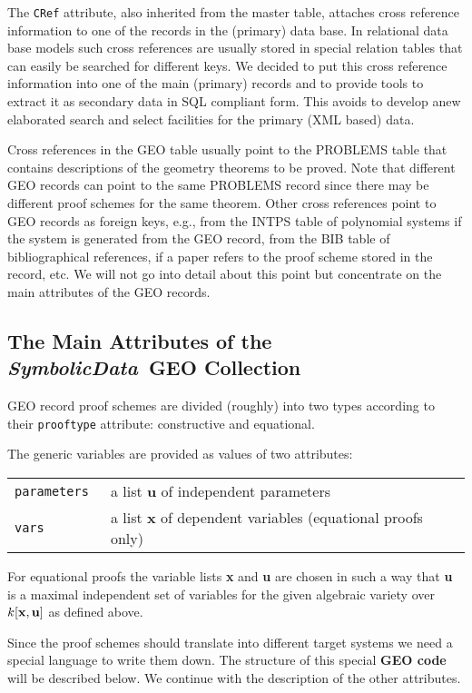 \documentclass[11pt]{article}
\newcommand{\SD}{{\it Symbo\-lic\-Data}}
\begin{document}
The {\tt CRef} attribute, also inherited from the master table,
attaches cross reference information to one of the records in the
(primary) data base.  In relational data base models such cross
references are usually stored in special relation tables that can
easily be searched for different keys.  We decided to put this
cross reference information into one of the main (primary)
records and to provide tools to extract it as secondary data in
SQL compliant form.  This avoids to develop anew elaborated
search and select facilities for the primary (XML based) data.

Cross references in the GEO table usually point to the PROBLEMS table
that contains descriptions of the geometry theorems to be proved. Note
that different GEO records can point to the same PROBLEMS record since
there may be different proof schemes for the same theorem. Other cross
references point to GEO records as foreign keys, e.g., from the INTPS
table of polynomial systems if the system is generated from the GEO
record, from the BIB table of bibliographical references, if a paper
refers to the proof scheme stored in the record, etc. We will not go
into detail about this point but concentrate on the main attributes of
the GEO records.

\subsection{The Main Attributes of the \SD\ GEO Collection}

GEO record proof schemes are divided (roughly) into two types
according to their {\tt prooftype} attribute: constructive and
equational.

The generic variables are provided as values of two attributes: 
\begin{center}
\begin{tabular}{lp{9cm}}
\tt parameters & a list {\bf u} of independent parameters\\
\tt vars & a list {\bf x} of dependent variables (equational
proofs only) \\
\end{tabular}
\end{center}
For equational proofs the variable lists {\bf x} and {\bf u} are
chosen in such a way that {\bf u} is a maximal independent set of
variables for the given algebraic variety over $k[{\bf x}, {\bf
u}]$ as defined above.

Since the proof schemes should translate into different target
systems we need a special language to write them down.  The
structure of this special {\bf GEO code} will be described
below. We continue with the description of the other attributes.
\end{document}
